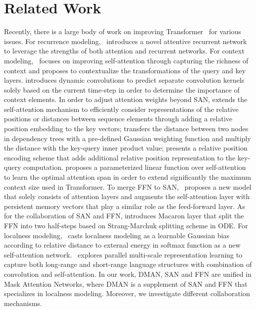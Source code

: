 \documentclass[11pt]{article}
\begin{document}
\section{Related Work}
Recently, there is a large body of work on improving Transformer~\cite{vaswani2017attention} for various issues. 
For recurrence modeling,~\citet{hao2019modeling} introduces a novel attentive recurrent network to leverage the strengths of both attention and recurrent networks.
For context modeling,~\citet{yang2019context} focuses on improving self-attention through capturing the richness of context and proposes to contextualize the transformations of the query and key layers.
\citet{wu2019pay} introduces dynamic convolutions to predict separate convolution kernels solely based on the current time-step in order to determine the importance of context elements.
In order to adjust attention weights beyond SAN, \citet{shaw2018self} extends the self-attention mechanism to efficiently consider representations of the relative positions or distances between sequence elements through adding a relative position embedding to the key vectors;
\citet{bugliarello2019improving} transfers the distance between two nodes in dependency trees with a pre-defined Gaussian weighting function and multiply the distance with the key-query inner product value; \citet{dai2019transformer} presents a relative position encoding scheme that adds additional relative position representation to the key-query computation.
\citet{sukhbaatar2019adaptive} proposes a parameterized linear function over self-attention to learn the optimal attention span in order to extend significantly the maximum context size used in Transformer. 
To merge FFN to SAN,~\citet{sukhbaatar2019augmenting} proposes a new model that solely consists of attention layers and augments the self-attention layer with persistent memory vectors that play a similar role as the feed-forward layer.
As for the collaboration of SAN and FFN, \citet{lu2019understanding} introduces Macaron layer that split the FFN into two half-steps based on Strang-Marchuk splitting scheme in ODE.
For localness modeling,~\citet{yang2018modeling} casts localness modeling as a learnable Gaussian bias according to relative distance to external energy in softmax function as a new self-attention network.~\citet{zhao2019muse} explores parallel multi-scale representation learning to capture both long-range and short-range language structures with combination of convolution and self-attention.
In our work, DMAN, SAN and FFN are unified in Mask Attention Networks, where DMAN is a supplement of SAN and FFN that specializes in localness modeling.  Moreover, we investigate different collaboration mechanisms. 
\end{document}
